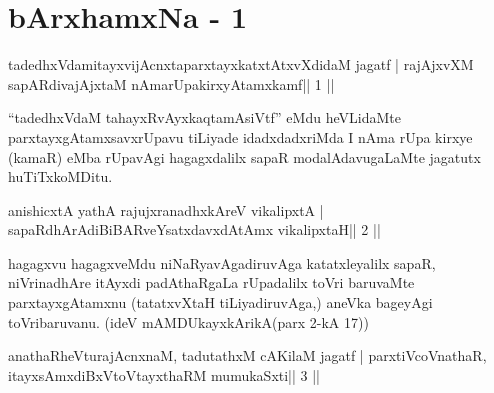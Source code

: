 



\chapter{bArxhamxNa - 1}


\begin{shl}
tadedhxVdamitayxvijAcnxtaparxtayxkatxtAtxvXdidaM jagatf |
rajAjxvXM sapARdivajAjxtaM nAmarUpakirxyAtamxkamf\hfill || 1 ||
\end{shl}

\begin{artha}
``tadedhxVdaM tahayxRvAyxkaqtamAsiVtf'' eMdu heVLidaMte parxtayxgAtamxsavxrUpavu tiLiyade idadxdadxriMda I nAma rUpa kirxye (kamaR) eMba rUpavAgi hagagxdalilx sapaR modalAdavugaLaMte jagatutx huTiTxkoMDitu.
\end{artha} 


\begin{shl}
anishicxtA yathA rajujxranadhxkAreV vikalipxtA |
sapaRdhArAdiBiBARveYsatxdavxdAtAmx vikalipxtaH\hfill || 2 ||
\end{shl}

\begin{artha}
hagagxvu hagagxveMdu niNaRyavAgadiruvAga katatxleyalilx sapaR, 
niVrinadhAre itAyxdi padAthaRgaLa rUpadalilx toVri baruvaMte 
parxtayxgAtamxnu (tatatxvXtaH tiLiyadiruvAga,) aneVka bageyAgi 
toVribaruvanu. (ideV mAMDUkayxkArikA\break (parx 2-kA 17)) 
\end{artha}


\begin{shl}
anathaRheVturajAcnxnaM, tadutathxM cAKilaM jagatf |
parxtiVcoV\s nathaR, itayxsAmxdiBxVtoV\s tayxthaRM mumukaSxti\hfill || 3 ||
\end{shl}

